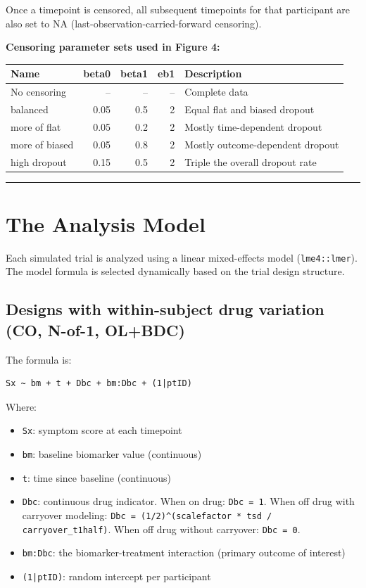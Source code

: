 \documentclass[11pt]{article}
\begin{document}
Once a timepoint is censored, all subsequent timepoints for that
participant are also set to NA (last-observation-carried-forward
censoring).

\textbf{Censoring parameter sets used in Figure 4:}

\begin{table}[h]
\centering
\begin{tabular}{lrrrl}
\toprule
Name & beta0 & beta1 & eb1 & Description \\
\midrule
No censoring & -- & -- & -- & Complete data \\
balanced & 0.05 & 0.5 & 2 & Equal flat and biased dropout \\
more of flat & 0.05 & 0.2 & 2 & Mostly time-dependent dropout \\
more of biased & 0.05 & 0.8 & 2 & Mostly outcome-dependent dropout \\
high dropout & 0.15 & 0.5 & 2 & Triple the overall dropout rate \\
\bottomrule
\end{tabular}
\end{table}

\bigskip\noindent\rule{\textwidth}{0.4pt}\bigskip

\section{The Analysis Model}

Each simulated trial is analyzed using a linear mixed-effects
model (\texttt{lme4::lmer}). The model formula is selected dynamically
based on the trial design structure.

\subsection{Designs with within-subject drug variation (CO, N-of-1, OL+BDC)}

The formula is:

\begin{verbatim}
Sx ~ bm + t + Dbc + bm:Dbc + (1|ptID)
\end{verbatim}

Where:

\begin{itemize}
  \item \texttt{Sx}: symptom score at each timepoint
  \item \texttt{bm}: baseline biomarker value (continuous)
  \item \texttt{t}: time since baseline (continuous)
  \item \texttt{Dbc}: continuous drug indicator. When on drug: \texttt{Dbc = 1}.
    When off drug with carryover modeling:
    \texttt{Dbc = (1/2)\^{}(scalefactor * tsd / carryover\_t1half)}.
    When off drug without carryover: \texttt{Dbc = 0}.
  \item \texttt{bm:Dbc}: the biomarker-treatment interaction (primary
    outcome of interest)
  \item \texttt{(1|ptID)}: random intercept per participant
\end{itemize}
\end{document}
